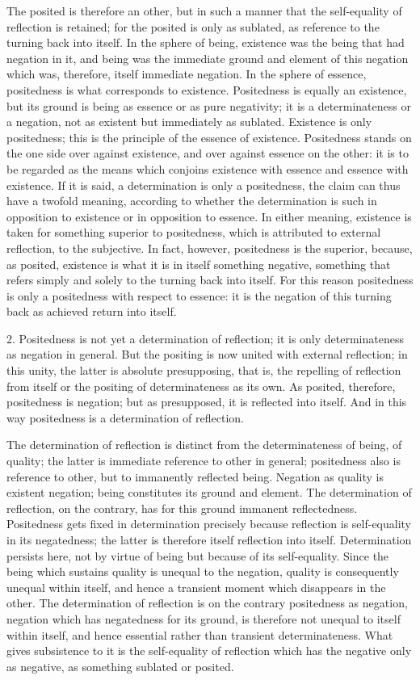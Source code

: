 The posited is therefore an other,
but in such a manner that the self-equality
of reflection is retained;
for the posited is only as sublated,
as reference to the turning back into itself.
In the sphere of being, existence was the being
that had negation in it, and being was the immediate ground
and element of this negation which was,
therefore, itself immediate negation.
In the sphere of essence,
positedness is what corresponds to existence.
Positedness is equally an existence,
but its ground is being as essence
or as pure negativity;
it is a determinateness or a negation,
not as existent but immediately as sublated.
Existence is only positedness;
this is the principle of the essence of existence.
Positedness stands on the one side over against existence,
and over against essence on the other:
it is to be regarded as the means which conjoins
existence with essence and essence with existence.
If it is said, a determination is only a positedness,
the claim can thus have a twofold meaning,
according to whether the determination is such
in opposition to existence or in opposition to essence.
In either meaning, existence is taken for
something superior to positedness,
which is attributed to external reflection, to the subjective.
In fact, however, positedness is the superior, because, as posited,
existence is what it is in itself something negative,
something that refers simply and solely to the turning back into itself.
For this reason positedness is only a positedness
with respect to essence:
it is the negation of this turning back
as achieved return into itself.

2. Positedness is not yet a determination of reflection;
it is only determinateness as negation in general.
But the positing is now united with external reflection;
in this unity, the latter is absolute presupposing, that is,
the repelling of reflection from itself
or the positing of determinateness as its own.
As posited, therefore, positedness is negation;
but as presupposed, it is reflected into itself.
And in this way positedness is a determination of reflection.

The determination of reflection is distinct
from the determinateness of being, of quality;
the latter is immediate reference to other in general;
positedness also is reference to other,
but to immanently reflected being.
Negation as quality is existent negation;
being constitutes its ground and element.
The determination of reflection, on the contrary,
has for this ground immanent reflectedness.
Positedness gets fixed in determination precisely
because reflection is self-equality in its negatedness;
the latter is therefore itself reflection into itself.
Determination persists here, not by virtue of being
but because of its self-equality.
Since the being which sustains quality is
unequal to the negation, quality is
consequently unequal within itself,
and hence a transient moment which disappears in the other.
The determination of reflection is
on the contrary positedness as negation,
negation which has negatedness for its ground,
is therefore not unequal to itself within itself,
and hence essential rather than transient determinateness.
What gives subsistence to it is the self-equality of reflection
which has the negative only as negative,
as something sublated or posited.

